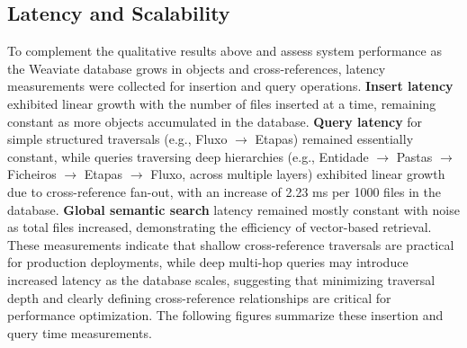 \subsection{Latency and Scalability}
To complement the qualitative results above and assess system performance as the Weaviate database grows in objects and cross-references, latency measurements were collected for insertion and query operations. \textbf{Insert latency} exhibited linear growth with the number of files inserted at a time, remaining constant as more objects accumulated in the database. \textbf{Query latency} for simple structured traversals (e.g., Fluxo $\rightarrow$ Etapas) remained essentially constant, while queries traversing deep hierarchies (e.g., Entidade $\rightarrow$ Pastas $\rightarrow$ Ficheiros $\rightarrow$ Etapas $\rightarrow$ Fluxo, across multiple layers) exhibited linear growth due to cross-reference fan-out, with an increase of 2.23 ms per 1000 files in the database. \textbf{Global semantic search} latency remained mostly constant with noise as total files increased, demonstrating the efficiency of vector-based retrieval. These measurements indicate that shallow cross-reference traversals are practical for production deployments, while deep multi-hop queries may introduce increased latency as the database scales, suggesting that minimizing traversal depth and clearly defining cross-reference relationships are critical for performance optimization. The following figures summarize these insertion and query time measurements.
